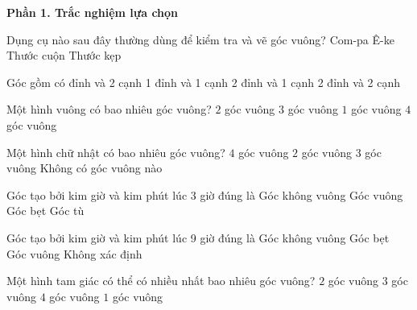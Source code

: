 \textbf{Phần 1. Trắc nghiệm lựa chọn}

\begin{ex} %
Dụng cụ nào sau đây thường dùng để kiểm tra và vẽ góc vuông?
\choice
{Com-pa}
{\True Ê-ke}
{Thước cuộn}
{Thước kẹp}
\end{ex}

\begin{ex} %
Góc gồm có
\choice
{ đỉnh và 2 cạnh}
{1 đỉnh và 1 cạnh}
{2 đỉnh và 1 cạnh}
{2 đỉnh và 2 cạnh}
\end{ex}

\begin{ex} %
Một hình vuông có bao nhiêu góc vuông?
\choice
{$2$ góc vuông}
{$3$ góc vuông}
{$1$ góc vuông}
{\True $4$ góc vuông}
\end{ex}

\begin{ex} %
Một hình chữ nhật có bao nhiêu góc vuông?
\choice
{\True $4$ góc vuông}
{$2$ góc vuông}
{$3$ góc vuông}
{Không có góc vuông nào}
\end{ex}

\begin{ex} %
Góc tạo bởi kim giờ và kim phút lúc 3 giờ đúng là
\choice
{Góc không vuông}
{\True Góc vuông}
{Góc bẹt}
{Góc tù}
\end{ex}

\begin{ex} %
Góc tạo bởi kim giờ và kim phút lúc 9 giờ đúng là
\choice
{Góc không vuông}
{Góc bẹt}
{\True Góc vuông}
{Không xác định}
\end{ex}

\begin{ex} %
Một hình tam giác có thể có nhiều nhất bao nhiêu góc vuông?
\choice
{$2$ góc vuông}
{$3$ góc vuông}
{$4$ góc vuông}
{\True $1$ góc vuông}
\end{ex}

